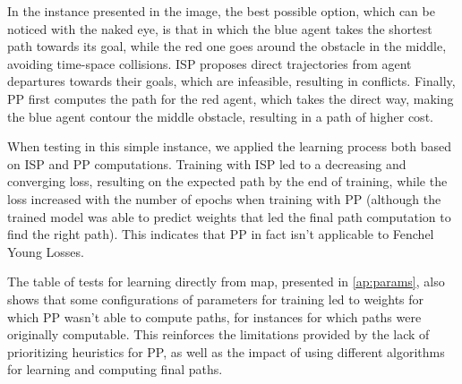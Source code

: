 In the instance presented in the image, the best possible option, which can be noticed with the naked eye, is that in which the blue agent takes the shortest path towards its goal, while the red one goes around the obstacle in the middle, avoiding time-space collisions. ISP proposes direct trajectories from agent departures towards their goals, which are infeasible, resulting in conflicts. Finally, PP first computes the path for the red agent, which takes the direct way, making the blue agent contour the middle obstacle, resulting in a path of higher cost.

When testing in this simple instance, we applied the learning process both based on ISP and PP computations. Training with ISP led to a decreasing and converging loss, resulting on the expected path by the end of training, while the loss increased with the number of epochs when training with PP (although the trained model was able to predict weights that led the final path computation to find the right path). This indicates that PP in fact isn't applicable to Fenchel Young Losses.

The table of tests for learning directly from map, presented in \ref{ap:params}, also shows that some configurations of parameters for training led to weights for which PP wasn't able to compute paths, for instances for which paths were originally computable. This reinforces the limitations provided by the lack of prioritizing heuristics for PP, as well as the impact of using different algorithms for learning and computing final paths.